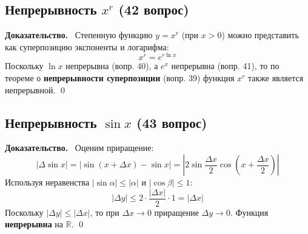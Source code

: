 \documentclass[a4paper,12pt]{article}
\newcommand{\tsubsection}[2]{\subsection[#1]{\texorpdfstring{#2}{#1}}}
\newcommand{\myproof}{\textbf{Доказательство.}\ }
\begin{document}
	\begin{center}
	\end{center}
	
	
	
	
	\vspace{1cm}
	\tsubsection{Непрерывность степенной функции (42 вопрос)}{Непрерывность $x^r$ (42 вопрос)}
	
	\myproof
	Степенную функцию $y = x^r$ (при $x > 0$) можно представить как суперпозицию экспоненты и логарифма:
	\[ x^r = e^{r \ln x} \]
	Поскольку $\ln x$ непрерывна (вопр. 40), а $e^x$ непрерывна (вопр. 41), то по теореме о \textbf{непрерывности суперпозиции} (вопр. 39) функция $x^r$ также является непрерывной. \qed
	
	\begin{center}
	\end{center}
	
	
	\tsubsection{Непрерывность синуса (43 вопрос)}{Непрерывность $\sin x$ (43 вопрос)}
	
	\myproof
	Оценим приращение:
	\[ |\Delta \sin x| = |\sin(x + \Delta x) - \sin x| = |2 \sin \frac{\Delta x}{2} \cos(x + \frac{\Delta x}{2})| \]
	Используя неравенства $|\sin \alpha| \le |\alpha|$ и $|\cos \beta| \le 1$:
	\[ |\Delta y| \le 2 \cdot \frac{|\Delta x|}{2} \cdot 1 = |\Delta x| \]
	Поскольку $|\Delta y| \le |\Delta x|$, то при $\Delta x \to 0$ приращение $\Delta y \to 0$. Функция \textbf{непрерывна} на $\mathbb{R}$. \qed
	
\end{document}
